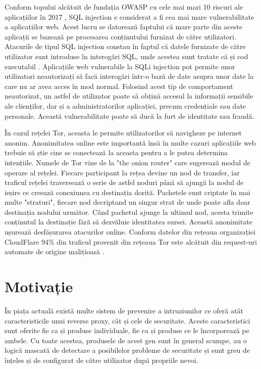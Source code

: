 Conform topului alcătuit de fundația OWASP cu cele mai mari 10 riscuri ale aplicațiilor în 2017 \cite{owasp}, SQL injection e considerat a fi cea mai mare vulnerabilitate a aplicațiilor web. Acest lucru se datorează faptului că mare parte din aceste aplicații se bazează pe procesarea conținutului furnizat de către utilizatori. Atacurile de tipul SQL injection constau în faptul că datele furnizate de către utilizator sunt introduse în interogări SQL, unde acestea sunt tratate că și cod executabil \cite{classification_and_countermeasures}. Aplicațiile web vulnerabile la SQLi injection pot permite unor utilizatori neautorizați să facă interogări într-o bază de date asupra unor date la care nu ar avea acces în mod normal. Folosind acest tip de comportament neautorizat, un astfel de utilizator poate să obțină accesul la informații sensibile ale clienților, dar și a administratorilor aplicației, precum credențiale sau date personale. Această vulnerabilitate poate să ducă la furt de identitate sau fraudă.  
 
În cazul rețelei Tor, aceasta le permite utilizatorilor să navigheze pe internet anonim. Anonimitatea online este importantă însă în multe cazuri aplicațiile web trebuie să știe cine se conectează la aceasta pentru a le putea determina intențiile. Numele de Tor vine de la "the onion router" care sugerează modul de operare al rețelei. Fiecare participant la rețea devine un nod de transfer, iar traficul rețelei traversează o serie de astfel noduri până să ajungă la nodul de ieșire ce creează conexiunea cu destinația dorită. Pachetele sunt criptate în mai multe "straturi", fiecare nod decriptand un singur strat de unde poate afla doar destinația nodului următor. Când pachetul ajunge la ultimul nod, acesta trimite conținutul la destinație fără să dezvăluie identitatea sursei. Această anonimitate ușurează desfășurarea atacurilor online. Conform datelor din rețeaua organizației CloudFlare 94\% din traficul provenit din rețeaua Tor este alcătuit din request-uri automate de origine malițioasă \cite{tor_trouble}. 

 \section{Motivație}
În piața actuală există multe sistem de prevenire a intruziunilor ce oferă atât caracteristicile unui reverse proxy, cât și cele de securitate. Aceste caracteristici sunt oferite fie ca și produse individuale, fie ca și produse ce le încorporează pe ambele. Cu toate acestea, produsele de acest gen sunt în general scumpe, au o logică mascată de detectare a posibilelor probleme de securitate și sunt greu de înțeles și de configurat de către utilizator după propriile nevoi. 

